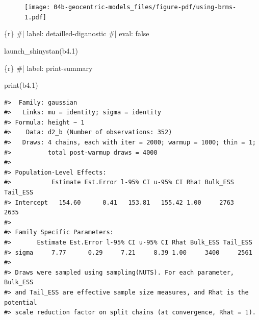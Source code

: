 \documentclass[
  letterpaper,
  DIV=11,
  numbers=noendperiod]{scrreprt}
\newenvironment{Shaded}{\begin{snugshade}}{\end{snugshade}}
\newcommand{\CommentTok}[1]{\textcolor[rgb]{0.37,0.37,0.37}{#1}}
\newcommand{\FloatTok}[1]{\textcolor[rgb]{0.68,0.00,0.00}{#1}}
\newcommand{\FunctionTok}[1]{\textcolor[rgb]{0.28,0.35,0.67}{#1}}
\newcommand{\InformationTok}[1]{\textcolor[rgb]{0.37,0.37,0.37}{#1}}
\newcommand{\NormalTok}[1]{\textcolor[rgb]{0.00,0.23,0.31}{#1}}
\newcommand{\SpecialCharTok}[1]{\textcolor[rgb]{0.37,0.37,0.37}{#1}}
\begin{document}
\begin{figure}[H]

{\centering \texttt{[image: 04b-geocentric-models\_files/figure-pdf/using-brms-1.pdf]}

}

\end{figure}

\begin{Shaded}
\begin{Highlighting}[]
\InformationTok{\textasciigrave{}\textasciigrave{}\textasciigrave{}\{r\}}
\CommentTok{\#| label: detailled{-}diganostic}
\CommentTok{\#| eval: false}

\FunctionTok{launch\_shinystan}\NormalTok{(b4}\FloatTok{.1}\NormalTok{)}

\InformationTok{\textasciigrave{}\textasciigrave{}\textasciigrave{}}
\end{Highlighting}
\end{Shaded}

\begin{Shaded}
\begin{Highlighting}[]
\InformationTok{\textasciigrave{}\textasciigrave{}\textasciigrave{}\{r\}}
\CommentTok{\#| label: print{-}summary}

\FunctionTok{print}\NormalTok{(b4}\FloatTok{.1}\NormalTok{)}
\InformationTok{\textasciigrave{}\textasciigrave{}\textasciigrave{}}
\end{Highlighting}
\end{Shaded}

\begin{verbatim}
#>  Family: gaussian 
#>   Links: mu = identity; sigma = identity 
#> Formula: height ~ 1 
#>    Data: d2_b (Number of observations: 352) 
#>   Draws: 4 chains, each with iter = 2000; warmup = 1000; thin = 1;
#>          total post-warmup draws = 4000
#> 
#> Population-Level Effects: 
#>           Estimate Est.Error l-95% CI u-95% CI Rhat Bulk_ESS Tail_ESS
#> Intercept   154.60      0.41   153.81   155.42 1.00     2763     2635
#> 
#> Family Specific Parameters: 
#>       Estimate Est.Error l-95% CI u-95% CI Rhat Bulk_ESS Tail_ESS
#> sigma     7.77      0.29     7.21     8.39 1.00     3400     2561
#> 
#> Draws were sampled using sampling(NUTS). For each parameter, Bulk_ESS
#> and Tail_ESS are effective sample size measures, and Rhat is the potential
#> scale reduction factor on split chains (at convergence, Rhat = 1).
\end{verbatim}

\begin{Shaded}
\end{Shaded}
\end{document}
